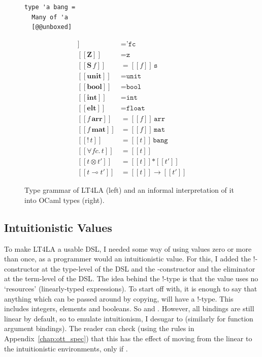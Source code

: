 \begin{figure}[tp]
\begin{minipage}{.3\textwidth}
\begin{verbatim}
type 'a bang =
  Many of 'a
  [@@unboxed]
        \end{verbatim}
    \end{minipage}
    \begin{minipage}{.3\textwidth}
        \begin{align*}
            [\![ f\!c ]\!] &= \texttt{'fc} \\
            [\![ \textbf{Z} ]\!] &= \texttt{z}\\
            [\![ \textbf{S} \, f ]\!] &= [\![ f ]\!]\, \texttt{s}\\
            [\![ \textbf{unit} ]\!] &= \texttt{unit}\\
            [\![ \textbf{bool} ]\!] &= \texttt{bool}\\
            [\![ \textbf{int} ]\!] &= \texttt{int}\\
            [\![ \textbf{elt} ]\!] &= \texttt{float}\\
            [\![ f\, \textbf{arr} ]\!] &= [\![ f ]\!]\, \texttt{arr}\\
            [\![ f\, \textbf{mat} ]\!] &= [\![ f ]\!]\, \texttt{mat}\\
            [\![ \textbf{!} \, t ]\!] &= [\![ t ]\!]\, \texttt{bang}\\
            [\![ \forall f\!c.\, t ]\!] &= [\![ t ]\!]\\
            [\![ t \otimes t' ]\!] &= [\![ t ]\!] \texttt{*} [\![ t' ]\!]\\
            [\![ t \multimap t' ]\!] &= [\![ t ]\!] \rightarrow [\![ t' ]\!]
        \end{align*}
    \end{minipage}
    \caption{Type grammar of LT4LA (left) and an informal interpretation of it
        into OCaml types (right).}\label{fig:type_grammar}
\end{figure}

\subsection{Intuitionistic Values}

To make LT4LA a usable DSL, I needed some way of using values zero or more than
once, as a programmer would an intuitionistic value. For this, I added the
!-constructor at the type-level of the DSL and the -constructor and
the  eliminator at the term-level of the DSL.
The idea behind the !-type is that the value uses no `resources'
(linearly-typed expressions). To start off with, it is enough to say that
anything which can be passed around by copying, will have a !-type. This
includes integers, elements and booleans. So  and . However, all bindings are still linear by default, so to
emulate intuitionism, I desugar  to
(similarly for function argument bindings). The reader can check (using the
rules in Appendix~\ref{chap:ott_spec}) that this has the effect of moving
 from the linear to the intuitionistic environments, only if
.

